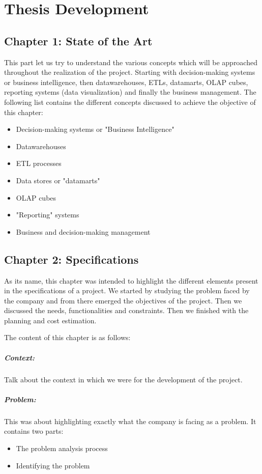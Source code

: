 \chapter*{Thesis Development}

\section*{Chapter 1: State of the Art}
This part let us try to understand the various concepts which will be approached throughout the realization of the project. Starting with decision-making systems or business intelligence, then datawarehouses, ETLs, datamarts, OLAP cubes, reporting systems (data visualization) and finally the business management. The following list contains the different concepts discussed to achieve the objective of this chapter:

\begin{itemize}
    \item Decision-making systems or "Business Intelligence"
    \item Datawarehouses
    \item ETL processes
    \item Data stores or "datamarts"
    \item OLAP cubes
    \item "Reporting" systems
    \item Business and decision-making management
\end{itemize}



\section*{Chapter 2: Specifications}
As its name, this chapter was intended to highlight the different elements present in the specifications of a project. We started by studying the problem faced by the company and from there emerged the objectives of the project. Then we discussed the needs, functionalities and constraints. Then we finished with the planning and cost estimation.

The content of this chapter is as follows:
\paragraph {Context:} Talk about the context in which we were for the development of the project.

\paragraph {Problem:} This was about highlighting exactly what the company is facing as a problem. It contains two parts:
\begin{itemize}
    \item The problem analysis process
    \item Identifying the problem
\end{itemize}

